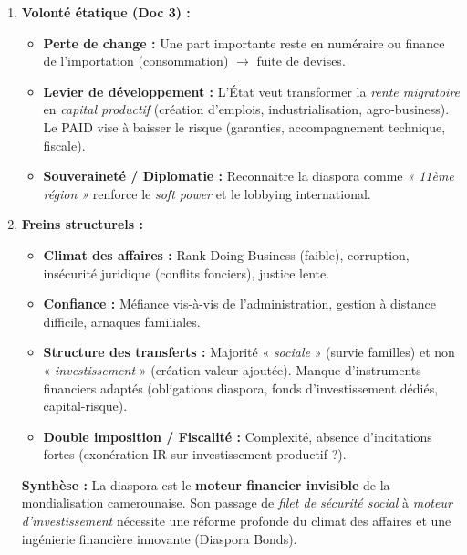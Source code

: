 \documentclass[11pt]{article}
\begin{document}
\begin{exoresolu}
\begin{enumerate}
\begin{itemize}
        \item \textbf{Impact territorial :} Concentration Littoral/Centre/Ouest (Doc 2). Dynamise l'immobilier (Yaoundé/Douala/Bafoussam), le commerce de détail, le BTP local.
    \end{itemize}
    \item \textbf{Volonté étatique (Doc 3) :}
    \begin{itemize}
        \item \textbf{Perte de change :} Une part importante reste en numéraire ou finance de l'importation (consommation) $\rightarrow$ fuite de devises.
        \item \textbf{Levier de développement :} L'État veut transformer la \emph{rente migratoire} en \emph{capital productif} (création d'emplois, industrialisation, agro-business). Le PAID vise à baisser le risque (garanties, accompagnement technique, fiscale).
        \item \textbf{Souveraineté / Diplomatie :} Reconnaitre la diaspora comme \emph{« 11ème région »} renforce le \emph{soft power} et le lobbying international.
    \end{itemize}
    \item \textbf{Freins structurels :}
    \begin{itemize}
        \item \textbf{Climat des affaires :} Rank Doing Business (faible), corruption, insécurité juridique (conflits fonciers), justice lente.
        \item \textbf{Confiance :} Méfiance vis-à-vis de l'administration, gestion à distance difficile, arnaques familiales.
        \item \textbf{Structure des transferts :} Majorité « \emph{sociale} » (survie familles) et non « \emph{investissement} » (création valeur ajoutée). Manque d'instruments financiers adaptés (obligations diaspora, fonds d'investissement dédiés, capital-risque).
        \item \textbf{Double imposition / Fiscalité :} Complexité, absence d'incitations fortes (exonération IR sur investissement productif ?).
    \end{itemize}
    \textbf{Synthèse :} La diaspora est le \textbf{moteur financier invisible} de la mondialisation camerounaise. Son passage de \emph{filet de sécurité social} à \emph{moteur d'investissement} nécessite une réforme profonde du climat des affaires et une ingénierie financière innovante (Diaspora Bonds).
\end{enumerate}
\end{exoresolu}
\end{document}
